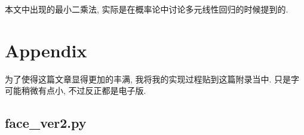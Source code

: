 \documentclass[fleqn,10pt]{SelfArx} %
\begin{document}
本文中出现的最小二乘法, 实际是在概率论\cite{prob}中讨论多元线性回归的时候提到的.






\section*{Appendix}
为了使得这篇文章显得更加的丰满, 我将我的实现过程贴到这篇附录当中.
只是字可能稍微有点小, 不过反正都是电子版.

\setmainfont{Monaco} %
\subsection*{face\_ver2.py}
\end{document}
